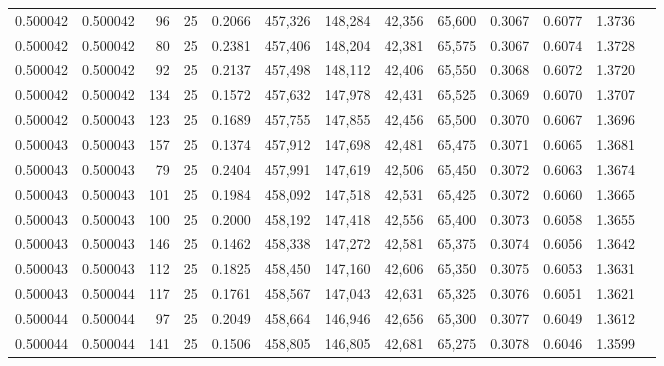 \begin{tabular}{rrrrrrrrrrrrr}
0.500042 & 0.500042 &    96 &  25 &                                     0.2066 & 457,326 & 148,284 &  42,356 &  65,600 & 0.3067 & 0.6077 & 1.3736 \\
0.500042 & 0.500042 &    80 &  25 &                                     0.2381 & 457,406 & 148,204 &  42,381 &  65,575 & 0.3067 & 0.6074 & 1.3728 \\
0.500042 & 0.500042 &    92 &  25 &                                     0.2137 & 457,498 & 148,112 &  42,406 &  65,550 & 0.3068 & 0.6072 & 1.3720 \\
0.500042 & 0.500042 &   134 &  25 &                                     0.1572 & 457,632 & 147,978 &  42,431 &  65,525 & 0.3069 & 0.6070 & 1.3707 \\
0.500042 & 0.500043 &   123 &  25 &                                     0.1689 & 457,755 & 147,855 &  42,456 &  65,500 & 0.3070 & 0.6067 & 1.3696 \\
0.500043 & 0.500043 &   157 &  25 &                                     0.1374 & 457,912 & 147,698 &  42,481 &  65,475 & 0.3071 & 0.6065 & 1.3681 \\
0.500043 & 0.500043 &    79 &  25 &                                     0.2404 & 457,991 & 147,619 &  42,506 &  65,450 & 0.3072 & 0.6063 & 1.3674 \\
0.500043 & 0.500043 &   101 &  25 &                                     0.1984 & 458,092 & 147,518 &  42,531 &  65,425 & 0.3072 & 0.6060 & 1.3665 \\
0.500043 & 0.500043 &   100 &  25 &                                     0.2000 & 458,192 & 147,418 &  42,556 &  65,400 & 0.3073 & 0.6058 & 1.3655 \\
0.500043 & 0.500043 &   146 &  25 &                                     0.1462 & 458,338 & 147,272 &  42,581 &  65,375 & 0.3074 & 0.6056 & 1.3642 \\
0.500043 & 0.500043 &   112 &  25 &                                     0.1825 & 458,450 & 147,160 &  42,606 &  65,350 & 0.3075 & 0.6053 & 1.3631 \\
0.500043 & 0.500044 &   117 &  25 &                                     0.1761 & 458,567 & 147,043 &  42,631 &  65,325 & 0.3076 & 0.6051 & 1.3621 \\
0.500044 & 0.500044 &    97 &  25 &                                     0.2049 & 458,664 & 146,946 &  42,656 &  65,300 & 0.3077 & 0.6049 & 1.3612 \\
0.500044 & 0.500044 &   141 &  25 &                                     0.1506 & 458,805 & 146,805 &  42,681 &  65,275 & 0.3078 & 0.6046 & 1.3599 \\

\end{tabular}
